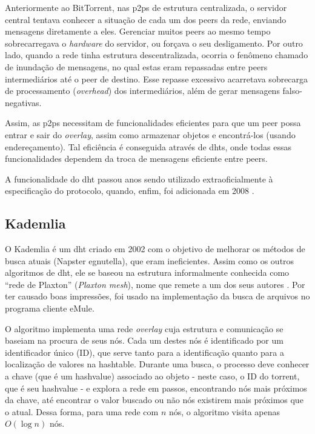 \begin{itemize}
Anteriormente ao BitTorrent, nas \glspl*{p2p} de estrutura centralizada, o servidor
central tentava conhecer a situação de cada um dos \glspl*{peer} da rede, enviando
mensagens diretamente a eles. Gerenciar muitos \glspl*{peer} ao mesmo tempo
sobrecarregava o \emph{hardware} do servidor, ou forçava o seu desligamento. Por outro
lado, quando a rede tinha estrutura descentralizada, ocorria o fenômeno chamado de
inundação de mensagens, no qual estas eram repassadas entre \glspl*{peer}
intermediários até o \gls*{peer} de destino. Esse repasse excessivo acarretava
sobrecarga de processamento (\emph{overhead}) dos intermediários, além de gerar
mensagens falso-negativas.

Assim, as \glspl*{p2p} necessitam de funcionalidades eficientes para que um \gls*{peer}
possa entrar e sair do \emph{overlay}, assim como armazenar objetos e encontrá-los
(usando endereçamento). Tal eficiência é conseguida através de \glspl{dht}, onde todas
essas funcionalidades dependem da troca de mensagens eficiente entre \glspl*{peer}.

\begin{figure}[H]
    \centering
\end{figure}

A funcionalidade do \gls*{dht} passou anos sendo utilizado extraoficialmente à
especificação do protocolo, quando, enfim, foi adicionada em 2008
\cite{site:bittorrent-dht}.

\subsection*{Kademlia}

O Kademlia é um \gls*{dht} criado em 2002 \cite{artigo:kademlia} com o objetivo de
melhorar os métodos de busca atuais (Napster e\gls*{gnutella}), que eram ineficientes.
Assim como os outros algoritmos de \gls*{dht}, ele se baseou na estrutura informalmente
conhecida como \enquote{rede de Plaxton} (\emph{Plaxton mesh}), nome que remete a um
dos seus autores \cite{artigo:dht}. Por ter causado boas impressões, foi usado na
implementação da busca de arquivos no programa cliente eMule.

O algoritmo implementa uma rede \emph{overlay} cuja estrutura e comunicação se baseiam
na procura de seus nós. Cada um destes nós é identificado por um identificador único
(ID), que serve tanto para a identificação quanto para a localização de valores na
\gls*{hashtable}. Durante uma busca, o processo deve conhecer a chave (que é um
\gls*{hashvalue}) associado ao objeto - neste caso, o ID do \gls*{torrent}, que é seu
\gls*{hashvalue} - e explora a rede em passos, encontrando nós mais próximos da chave,
até encontrar o valor buscado ou não nós existirem mais próximos que o atual. Dessa
forma, para uma rede com $n$ nós, o algoritmo visita apenas $O(\log n)$ nós.


\end{itemize}
